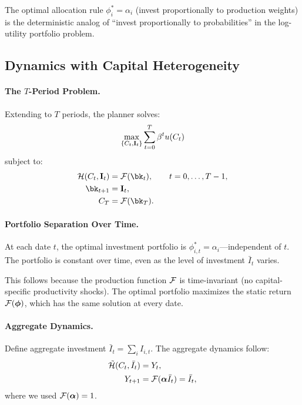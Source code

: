 The optimal allocation rule $\phi_i^* = \alpha_i$ (invest proportionally to production weights) is the deterministic analog of ``invest proportionally to probabilities'' in the log-utility portfolio problem.

\subsection{Dynamics with Capital Heterogeneity}
\label{subsec:ac-het-dynamics}

\paragraph{The $T$-Period Problem.}
Extending to $T$ periods, the planner solves:
\begin{equation}
\max_{\{C_t, \mathbf{I}_t\}} \sum_{t=0}^{T} \beta^t u(C_t)
\label{eq:ac-het-T-obj}
\end{equation}
subject to:
\begin{align}
\Hfun(C_t, \bI_t) &= \F(\bk_t), \qquad t = 0, \ldots, T-1, \\
\bk_{t+1} &= \bI_t, \\
C_T &= \F(\bk_T).
\end{align}

\paragraph{Portfolio Separation Over Time.}
At each date $t$, the optimal investment portfolio is $\phi_{i,t}^* = \alpha_i$---independent of $t$. The portfolio is constant over time, even as the level of investment $\bar{I}_t$ varies.

This follows because the production function $\mathcal{F}$ is time-invariant (no capital-specific productivity shocks). The optimal portfolio maximizes the static return $\mathcal{F}(\boldsymbol{\phi})$, which has the same solution at every date.

\paragraph{Aggregate Dynamics.}
Define aggregate investment $\bar{I}_t = \sum_i I_{i,t}$. The aggregate dynamics follow:
\begin{align}
\tilde{\mathcal{H}}(C_t, \bar{I}_t) &= Y_t, \\
Y_{t+1} &= \mathcal{F}(\boldsymbol{\alpha} \bar{I}_t) = \bar{I}_t,
\end{align}
where we used $\mathcal{F}(\boldsymbol{\alpha}) = 1$.


